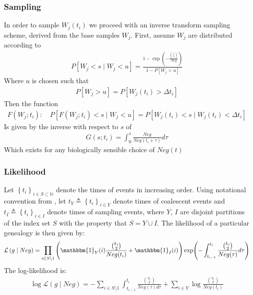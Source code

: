 \documentclass{article}
\newcommand{\N}{\mathbb{N}}
\theoremstyle{definition}
\begin{document}
\subsubsection{Sampling}
In order to sample $W_j(t_i)$ we proceed with an inverse transform sampling scheme, derived from the base samples $W_j$. 
First, assume $W_j$ are distributed according to 
\begin{gather}
  P[W_j < s \mid W_j < u] = \frac{1-\exp(-\frac{\binom{j}{2}}{Neg})}{1-P[W_j>u]}
\end{gather}
Where $u$ is chosen such that
\begin{gather}
P[W_j>u] = P[W_j(t_i) > \Delta t_i]
\end{gather}
Then the function
\begin{gather}
F(W_j; t_i):\quad P[F(W_j;t_i) < s \mid W_j < u] = P[W_j(t_i) < s \mid W_j(t_i) < \Delta t_i] 
\end{gather}
Is given by the inverse with respect to $s$ of
\begin{gather}
G(s; t_i) = \int_0^s \frac{Neg}{Neg(t_i+\tau)}d\tau
\end{gather}
Which exists for any biologically sensible choice of $Neg(t)$
\subsubsection{Likelihood}
Let $\left\{t_i\right\}_{i\in S\subset \N}$ denote the times of events in increasing order. Using notational convention from \cite{drummond_estimating_2002}, let $t_Y\triangleq \left\{t_i\right\}_{i\in Y}$ denote times of coalescent events and $t_I\triangleq \left\{t_i\right\}_{i\in I}$ denote times of sampling events, where $Y$, $I$ are disjoint partitions of the index set $S$ with the property that $S = Y\cup I$.
The likelihood of a particular genealogy is then given by:
\begin{gather}
\mathcal{L}\left(g\mid Neg\right) 
= \prod_{i\in S\setminus 1}\left(\mathbbm{1}_Y(i)\frac{\binom{k_i}{2}}{Neg(t_i)}+\mathbbm{1}_I(i)\right)
\exp(-\int_{t_{i-1}}^{t_i}\frac{\binom{k_i}{2}}{Neg(\tau)}d\tau)
\end{gather}
The log-likelihood is:
\begin{gather}
\log\mathcal{L}\left(g\mid Neg\right) 
= -\sum_{i\in S\setminus 1}{\int_{t_{i-1}}^{t_i}{\frac{\binom{k_i}{2}}{Neg(\tau)d\tau}}} + \sum_{i\in Y}{\log\frac{\binom{k_i}{2}}{Neg(t_i)}}
\end{gather}
\end{document}
